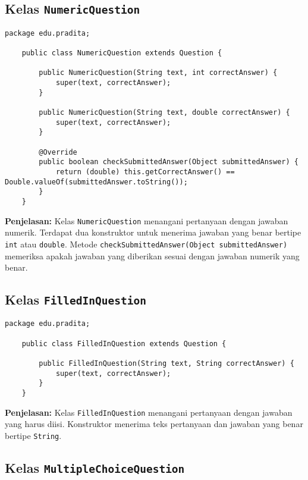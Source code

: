 \subsection{Kelas \texttt{NumericQuestion}}

\begin{lstlisting}[style=JavaStyle]
	package edu.pradita;
	
	public class NumericQuestion extends Question {
		
		public NumericQuestion(String text, int correctAnswer) {
			super(text, correctAnswer);
		}
		
		public NumericQuestion(String text, double correctAnswer) {
			super(text, correctAnswer);
		}
		
		@Override
		public boolean checkSubmittedAnswer(Object submittedAnswer) {
			return (double) this.getCorrectAnswer() == Double.valueOf(submittedAnswer.toString());
		}
	}
\end{lstlisting}

\textbf{Penjelasan:} Kelas \texttt{NumericQuestion} menangani pertanyaan dengan jawaban numerik. Terdapat dua konstruktor untuk menerima jawaban yang benar bertipe \texttt{int} atau \texttt{double}. Metode \texttt{checkSubmittedAnswer(Object submittedAnswer)} memeriksa apakah jawaban yang diberikan sesuai dengan jawaban numerik yang benar.

\subsection{Kelas \texttt{FilledInQuestion}}

\begin{lstlisting}[style=JavaStyle]
	package edu.pradita;
	
	public class FilledInQuestion extends Question {
		
		public FilledInQuestion(String text, String correctAnswer) {
			super(text, correctAnswer);
		}
	}
\end{lstlisting}

\textbf{Penjelasan:} Kelas \texttt{FilledInQuestion} menangani pertanyaan dengan jawaban yang harus diisi. Konstruktor menerima teks pertanyaan dan jawaban yang benar bertipe \texttt{String}.

\subsection{Kelas \texttt{MultipleChoiceQuestion}}

